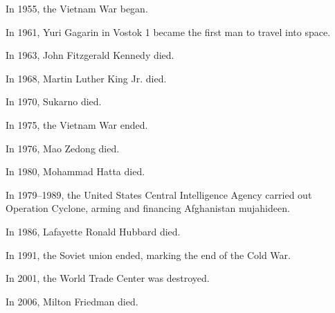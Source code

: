 In 1955, the Vietnam War began.

In 1961, Yuri Gagarin in Vostok 1
became the first man to travel into space.

In 1963, John Fitzgerald Kennedy died.

In 1968, Martin Luther King Jr. died.

In 1970, Sukarno died.

In 1975, the Vietnam War ended.

In 1976, Mao Zedong died.

In 1980, Mohammad Hatta died.

In 1979--1989, the United States Central Intelligence Agency
carried out Operation Cyclone,
arming and financing Afghanistan mujahideen.

In 1986, Lafayette Ronald Hubbard died.

In 1991, the Soviet union ended, marking the end of the Cold War.

In 2001, the World Trade Center was destroyed.

In 2006, Milton Friedman died.
